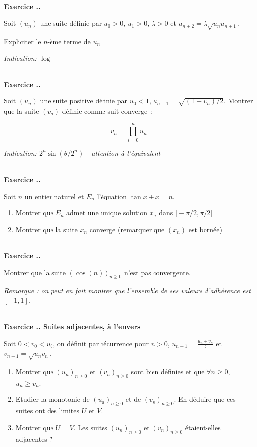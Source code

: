 \documentclass{article}
\newcounter{exo}
\newcommand{\exercice}[1][\null]{\textbf{\\ Exercice \thesection.\theexo. #1} \addtocounter{exo}{1}}
\begin{document}
\exercice 

Soit $(u_n)$ une suite définie par $u_0 > 0$, $u_1 > 0$, $\lambda > 0$
et $u_{n+2} = \lambda \sqrt{u_n u_{n+1}}$.

Expliciter le $n$-ème terme de $u_n$

\emph{Indication: $\log$}

\exercice 

Soit $(u_n)$ une suite positive définie par $u_0 < 1$,
$u_{n+1} = \sqrt{(1 + u_n) / 2}$. 
Montrer que la suite $(v_n)$ définie comme suit converge~:

\begin{equation*}
    v_n = \prod_{i = 0}^n u_n
\end{equation*}

\emph{Indication: $2^n \sin (\theta/ 2^n)$ - attention à l'équivalent}

\exercice 

Soit $n$ un entier naturel et $E_n$ l'équation
$\tan x + x = n$.

\begin{enumerate}
    \item Montrer que $E_n$ admet une unique solution $x_n$ dans 
    $]-\pi/2, \pi/2[$
    \item Montrer que la suite $x_n$ converge (remarquer que $(x_n)$ 
        est bornée)
\end{enumerate}


\exercice

Montrer que la suite $(\cos(n))_{n \ge 0}$ n'est pas convergente.

\emph{Remarque : on peut en fait montrer que l'ensemble de ses valeurs d'adhérence est $[-1,1]$.}



\exercice[Suites adjacentes, à l'envers]

Soit $0 < v_0 < u_0$, on définit par récurrence pour $n > 0$, $u_{n+1} = \frac{u_n+v_n}{2}$ et $v_{n+1} = \sqrt{u_n v_n}$.

\begin{enumerate}

\item Montrer que $(u_n)_{n \ge 0}$ et $(v_n)_{n \ge 0}$ sont bien définies et que $\forall n \ge 0$, $u_n \ge v_n$.

\item Etudier la monotonie de $(u_n)_{n \ge 0}$ et de $(v_n)_{n \ge 0}$. En déduire que ces suites ont des limites $U$ et $V$.

\item Montrer que $U =V$. Les suites $(u_n)_{n \ge 0}$ et $(v_n)_{n \ge 0}$ étaient-elles adjacentes ?


\end{enumerate}
\end{document}
